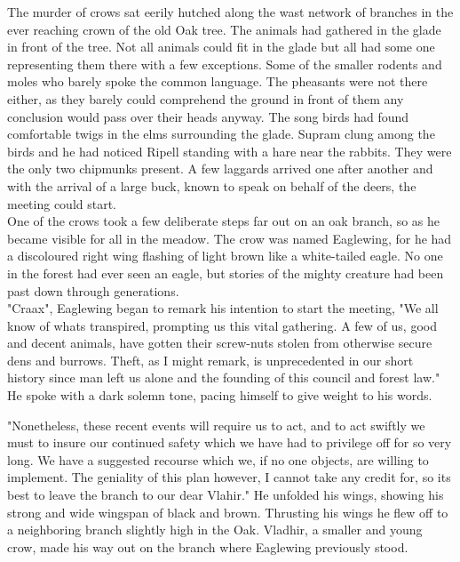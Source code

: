 \documentclass[smalldemyvopaper,11pt,twoside,onecolumn,openright,extrafontsizes]{memoir}
\begin{document}
The murder of crows sat eerily hutched along the wast network of branches in the ever reaching crown of the old Oak tree. The animals had gathered in the glade in front of the tree. Not all animals could fit in the glade but all had some one representing them there with a few exceptions. Some of the smaller rodents and moles who barely spoke the common language. The pheasants were not there either, as they barely could comprehend the ground in front of them any conclusion would pass over their heads anyway. The song birds had found comfortable twigs in the elms surrounding the glade. Supram clung among the birds and he had noticed Ripell standing with a hare near the rabbits. They were the only two chipmunks present. A few laggards arrived one after another and with the arrival of a large buck, known to speak on behalf of the deers, the meeting could start. \\

One of the crows took a few deliberate steps far out on an oak branch, so as he became visible for all in the meadow. The crow was named Eaglewing, for he had a discoloured right wing flashing of light brown like a white-tailed eagle. No one in the forest had ever seen an eagle, but stories of the mighty creature had been past down through generations.\\

"Craax", Eaglewing began to remark his intention to start the meeting, "We all know of whats transpired, prompting us this vital gathering. A few of us, good and decent animals, have gotten their screw-nuts stolen from otherwise secure dens and burrows. Theft, as I might remark, is unprecedented in our short history since man left us alone and the founding of this council and forest law." He spoke with a dark solemn tone, pacing himself to give weight to his words.

"Nonetheless, these recent events will require us to act, and to act swiftly we must to insure our continued safety which we have had to privilege off for so very long. We have a suggested recourse which we, if no one objects, are willing to implement. The geniality of this plan however, I cannot take any credit for, so its best to leave the branch to our dear Vlahir." He unfolded his wings, showing his strong and wide wingspan of black and brown. Thrusting his wings he flew off to a neighboring branch slightly high in the Oak. Vladhir, a smaller and young crow, made his way out on the branch where Eaglewing previously stood.\\
\end{document}
